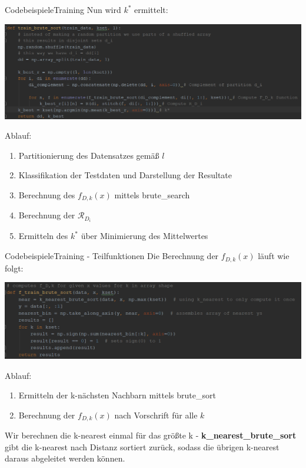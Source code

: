 \documentclass[9pt]{beamer}
\begin{document}
\begin{frame}{Codebeispiele}{Training}
Nun wird $k^*$ ermittelt:
\begin{center}
\includegraphics[scale=0.5]{assets/train_brute.png}
\end{center}
Ablauf:
\begin{enumerate}[1.]
\item{Partitionierung des Datensatzes gemäß $l$}
\item{Klassifikation der Testdaten und Darstellung der Resultate}
\item{Berechnung des $f_{D, k}(x)$ mittels brute\_search}
\item{Berechnung der $\mathcal{R}_{D_i}$}
\item{Ermitteln des $k^*$ über Minimierung des Mittelwertes}
\end{enumerate}
\end{frame}

\begin{frame}{Codebeispiele}{Training - Teilfunktionen}
Die Berechnung der $f_{D, k}(x)$ läuft wie folgt:
\begin{center}
\includegraphics[scale=0.6]{assets/train_brute_sort.png}
\end{center}
Ablauf:
\begin{enumerate}[1.]
\item{Ermitteln der k-nächsten Nachbarn mittels brute\_sort}
\item{Berechnung der $f_{D, k}(x)$ nach Vorschrift für alle $k$}
\end{enumerate}
Wir berechnen die k-nearest einmal für das größte k - \textbf{k\_nearest\_brute\_sort} gibt die k-nearest nach Distanz sortiert zurück, sodass die übrigen k-nearest daraus abgeleitet werden können.
\end{frame}
\end{document}
